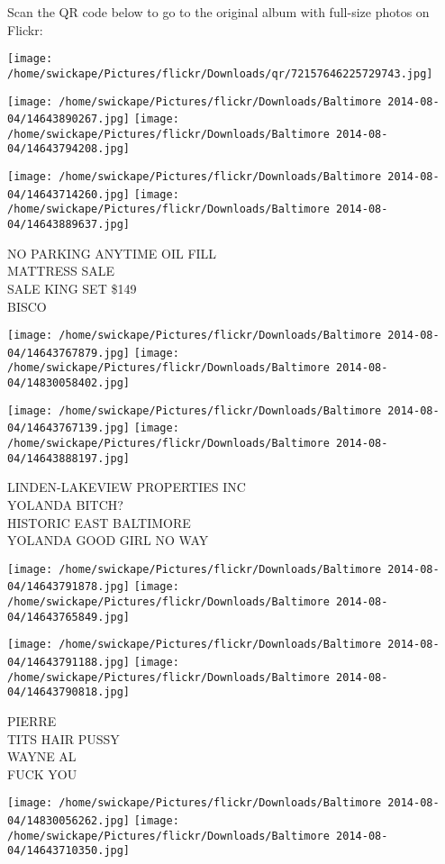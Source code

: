 \documentclass[10pt,letterpaper]{article}
\begin{document}
Scan the QR code below to go to the original album with full-size photos on Flickr:

\texttt{[image: /home/swickape/Pictures/flickr/Downloads/qr/72157646225729743.jpg]}
\pagebreak

\texttt{[image: /home/swickape/Pictures/flickr/Downloads/Baltimore 2014-08-04/14643890267.jpg]}
\texttt{[image: /home/swickape/Pictures/flickr/Downloads/Baltimore 2014-08-04/14643794208.jpg]}

\texttt{[image: /home/swickape/Pictures/flickr/Downloads/Baltimore 2014-08-04/14643714260.jpg]}
\texttt{[image: /home/swickape/Pictures/flickr/Downloads/Baltimore 2014-08-04/14643889637.jpg]}

NO PARKING ANYTIME OIL FILL\\
MATTRESS SALE\\
SALE KING SET \$149\\
BISCO
\pagebreak

\texttt{[image: /home/swickape/Pictures/flickr/Downloads/Baltimore 2014-08-04/14643767879.jpg]}
\texttt{[image: /home/swickape/Pictures/flickr/Downloads/Baltimore 2014-08-04/14830058402.jpg]}

\texttt{[image: /home/swickape/Pictures/flickr/Downloads/Baltimore 2014-08-04/14643767139.jpg]}
\texttt{[image: /home/swickape/Pictures/flickr/Downloads/Baltimore 2014-08-04/14643888197.jpg]}

LINDEN{-}LAKEVIEW PROPERTIES INC\\
YOLANDA BITCH?\\
HISTORIC EAST BALTIMORE\\
YOLANDA GOOD GIRL NO WAY
\pagebreak

\texttt{[image: /home/swickape/Pictures/flickr/Downloads/Baltimore 2014-08-04/14643791878.jpg]}
\texttt{[image: /home/swickape/Pictures/flickr/Downloads/Baltimore 2014-08-04/14643765849.jpg]}

\texttt{[image: /home/swickape/Pictures/flickr/Downloads/Baltimore 2014-08-04/14643791188.jpg]}
\texttt{[image: /home/swickape/Pictures/flickr/Downloads/Baltimore 2014-08-04/14643790818.jpg]}

PIERRE\\
TITS HAIR PUSSY\\
WAYNE AL\\
FUCK YOU
\pagebreak

\texttt{[image: /home/swickape/Pictures/flickr/Downloads/Baltimore 2014-08-04/14830056262.jpg]}
\texttt{[image: /home/swickape/Pictures/flickr/Downloads/Baltimore 2014-08-04/14643710350.jpg]}
\end{document}

